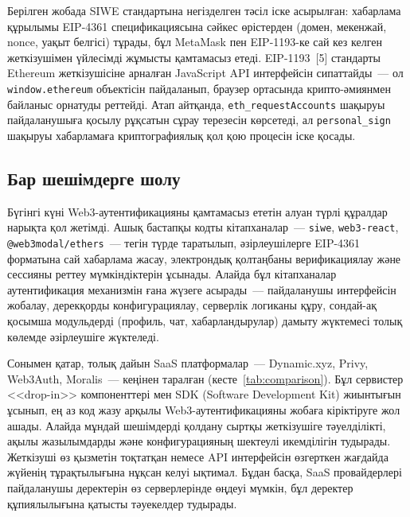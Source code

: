 \documentclass[14pt,a4paper]{extarticle}
\begin{document}
Берілген жобада SIWE стандартына негізделген тәсіл іске асырылған: хабарлама құрылымы EIP-4361 спецификациясына сәйкес өрістерден (домен, мекенжай, nonce, уақыт белгісі) тұрады, бұл MetaMask пен EIP-1193-ке сай кез келген жеткізушімен үйлесімді жұмысты қамтамасыз етеді. EIP-1193~[5] стандарты Ethereum жеткізушісіне арналған JavaScript API интерфейсін сипаттайды~--- ол \texttt{window.ethereum} объектісін пайдаланып, браузер ортасында крипто-әмиянмен байланыс орнатуды реттейді. Атап айтқанда, \texttt{eth\_requestAccounts} шақыруы пайдаланушыға қосылу рұқсатын сұрау терезесін көрсетеді, ал \texttt{personal\_sign} шақыруы хабарламаға криптографиялық қол қою процесін іске қосады.

\subsection{Бар шешімдерге шолу}

Бүгінгі күні Web3-аутентификацияны қамтамасыз ететін алуан түрлі құралдар нарықта қол жетімді. Ашық бастапқы кодты кітапханалар~--- \texttt{siwe}, \texttt{web3-react}, \texttt{@web3modal/ethers}~--- тегін түрде таратылып, әзірлеушілерге EIP-4361 форматына сай хабарлама жасау, электрондық қолтаңбаны верификациялау және сессияны реттеу мүмкіндіктерін ұсынады. Алайда бұл кітапханалар аутентификация механизмін ғана жүзеге асырады~--- пайдаланушы интерфейсін жобалау, дерекқорды конфигурациялау, серверлік логиканы құру, сондай-ақ қосымша модульдерді (профиль, чат, хабарландырулар) дамыту жүктемесі толық көлемде әзірлеушіге жүктеледі.

Сонымен қатар, толық дайын SaaS платформалар~--- Dynamic.xyz, Privy, Web3Auth, Moralis~--- кеңінен таралған (кесте~\ref{tab:comparison}). Бұл сервистер <<drop-in>> компоненттері мен SDK (Software Development Kit) жиынтығын ұсынып, ең аз код жазу арқылы Web3-аутентификацияны жобаға кіріктіруге жол ашады. Алайда мұндай шешімдерді қолдану сыртқы жеткізушіге тәуелділікті, ақылы жазылымдарды және конфигурацияның шектеулі икемділігін тудырады. Жеткізуші өз қызметін тоқтатқан немесе API интерфейсін өзгерткен жағдайда жүйенің тұрақтылығына нұқсан келуі ықтимал. Бұдан басқа, SaaS провайдерлері пайдаланушы деректерін өз серверлерінде өңдеуі мүмкін, бұл деректер құпиялылығына қатысты тәуекелдер тудырады.
\end{document}
